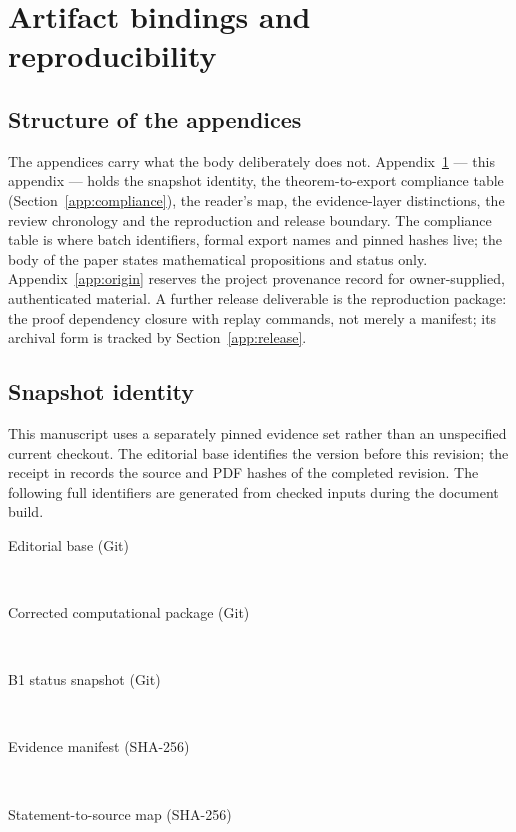 \section{Artifact bindings and reproducibility}\label{app:trust}
\subsection{Structure of the appendices}
The appendices carry what the body deliberately does not.
Appendix~\ref{app:trust} --- this appendix --- holds the snapshot
identity, the theorem-to-export compliance table
(Section~\ref{app:compliance}), the reader's map, the evidence-layer
distinctions, the review chronology and the reproduction and release
boundary. The compliance table is where batch identifiers, formal
export names and pinned hashes live; the body of the paper states
mathematical propositions and status only. Appendix~\ref{app:origin}
reserves the project provenance record for owner-supplied, authenticated
material. A further release deliverable is the reproduction package:
the proof dependency closure with replay commands, not merely a
manifest; its archival form is tracked by
Section~\ref{app:release}.

\subsection{Snapshot identity}\label{app:bindings}
This manuscript uses a separately pinned evidence set rather than an
unspecified current checkout. The editorial base identifies the version
before this revision; the receipt in  records the source
and PDF hashes of the completed revision. The following full identifiers
are generated from checked inputs during the document build.

\begin{description}
\item[Editorial base (Git)] \hfill\\
  \texttt{\EditorialBaseCommit}
\item[Corrected computational package (Git)] \hfill\\
  \texttt{\ComputationalCommit}
\item[B1 status snapshot (Git)] \hfill\\
  \texttt{\BOneStatusCommit}
\item[Evidence manifest (SHA-256)] \hfill\\
  \texttt{\EvidenceManifestSHA}
\item[Statement-to-source map (SHA-256)] \hfill\\
  \texttt{\SourceMapSHA}
\end{description}

